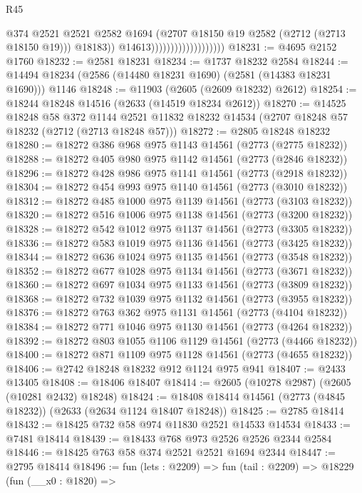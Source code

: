 \begin{lexlean}{R45}
\begin{coremodule}
                                              @374
                                              @2521
                                              @2521
                                              @2582
                                              @1694
                                              (@2707 @18150 @19 @2582 (@2712 (@2713 @18150 @19)))
                                              @18183))
                                          @14613)))))))))))))))))))
@18231 := @4695 @2152 @1760
@18232 := @2581 @18231
@18234 := @1737 @18232 @2584
@18244 := @14494 @18234 (@2586 (@14480 @18231 @1690) (@2581 (@14383 @18231 @1690))) @1146
@18248 := @11903 (@2605 (@2609 @18232) @2612)
@18254 := @18244 @18248 @14516 (@2633 (@14519 @18234 @2612))
@18270 := @14525
    @18248
    @58
    @372
    @1144
    @2521
    @11832
    @18232
    @14534
    (@2707 @18248 @57 @18232 (@2712 (@2713 @18248 @57)))
@18272 := @2805 @18248 @18232
@18280 := @18272 @386 @968 @975 @1143 @14561 (@2773 (@2775 @18232))
@18288 := @18272 @405 @980 @975 @1142 @14561 (@2773 (@2846 @18232))
@18296 := @18272 @428 @986 @975 @1141 @14561 (@2773 (@2918 @18232))
@18304 := @18272 @454 @993 @975 @1140 @14561 (@2773 (@3010 @18232))
@18312 := @18272 @485 @1000 @975 @1139 @14561 (@2773 (@3103 @18232))
@18320 := @18272 @516 @1006 @975 @1138 @14561 (@2773 (@3200 @18232))
@18328 := @18272 @542 @1012 @975 @1137 @14561 (@2773 (@3305 @18232))
@18336 := @18272 @583 @1019 @975 @1136 @14561 (@2773 (@3425 @18232))
@18344 := @18272 @636 @1024 @975 @1135 @14561 (@2773 (@3548 @18232))
@18352 := @18272 @677 @1028 @975 @1134 @14561 (@2773 (@3671 @18232))
@18360 := @18272 @697 @1034 @975 @1133 @14561 (@2773 (@3809 @18232))
@18368 := @18272 @732 @1039 @975 @1132 @14561 (@2773 (@3955 @18232))
@18376 := @18272 @763 @362 @975 @1131 @14561 (@2773 (@4104 @18232))
@18384 := @18272 @771 @1046 @975 @1130 @14561 (@2773 (@4264 @18232))
@18392 := @18272 @803 @1055 @1106 @1129 @14561 (@2773 (@4466 @18232))
@18400 := @18272 @871 @1109 @975 @1128 @14561 (@2773 (@4655 @18232))
@18406 := @2742 @18248 @18232 @912 @1124 @975 @941
@18407 := @2433 @13405
@18408 := @18406 @18407
@18414 := @2605 (@10278 @2987) (@2605 (@10281 @2432) @18248)
@18424 := @18408 @18414 @14561 (@2773 (@4845 @18232)) (@2633 (@2634 @1124 @18407 @18248))
@18425 := @2785 @18414
@18432 := @18425 @732 @58 @974 @11830 @2521 @14533 @14534
@18433 := @7481 @18414
@18439 := @18433 @768 @973 @2526 @2526 @2344 @2584
@18446 := @18425 @763 @58 @374 @2521 @2521 @1694 @2344
@18447 := @2795 @18414
@18496 := fun (lets : @2209) =>
  fun (tail : @2209) =>
  @18229
    (fun (__x0 : @1820) =>

\end{coremodule}
\end{lexlean}
